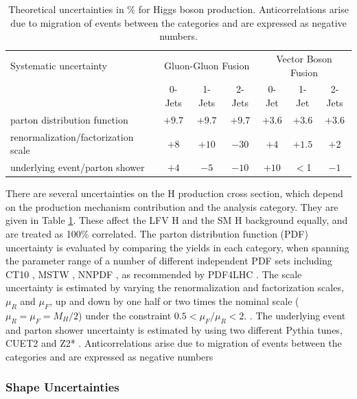 \documentclass[oneside, letterpaper, oldfontcommands]{memoir}
\begin{document}
\begin{table}[hbtp]
 \centering
  \caption{Theoretical uncertainties in \% for Higgs boson production. Anticorrelations arise due to  migration of events between the categories and are expressed as negative numbers. }
  \label{tab:theory_systematics}
  \begin{tabular}{lccc|ccc} \hline
Systematic uncertainty                  &  \multicolumn{3}{c|}{Gluon-Gluon Fusion} &  \multicolumn{3}{c}{Vector Boson Fusion}  \\ \cline{2-7}
                                &    0-Jets  & 1-Jets  & 2-Jets   & 0-Jet & 1-Jet  & 2-Jets  \\ \hline
parton distribution function         &    $+9.7$  &  $+9.7$ &   $+9.7$ & $+3.6$  &   $+3.6$  &  $+3.6$  \\
renormalization/factorization scale           &    $+8$    &  $+10$   &  $-30$   & $+4$     &   $+1.5$  & $+2$   \\
underlying event/parton shower  &   $+4$     & $-5$   &  $-10$   & $+10$    &   $<$1    & $-1$   \\ \hline
  \end{tabular}

\end{table}


\qquad There are several uncertainties on the H production cross section, which depend on the production mechanism contribution and the analysis category. They are given in Table \ref{tab:theory_systematics}. These affect the LFV H and the SM H background equally, and are treated as 100\% correlated. The parton distribution function (PDF) uncertainty is evaluated by comparing the yields in each category, when spanning the parameter range of a number of different independent PDF sets including CT10 \cite{Nadolsky:2008zw}, MSTW \cite{Martin:2009iq}, NNPDF \cite{Ball:2010de}, as recommended by PDF4LHC \cite{Alekhin:2011sk}. The scale uncertainty is estimated by varying the renormalization and factorization scales, $\mu_{R}$ and $\mu_{F}$, up and down by one half or two times the nominal scale ($\mu_{R} = \mu_{F} = M_{H}/2$) under the constraint $0.5 < \mu_{F}/\mu_{R} < 2$. \cite{Dittmaier:2011ti}. The underlying event and parton shower uncertainty is estimated by using two different {\sc Pythia} tunes, CUET2\cite{Khachatryan:2015pea} and Z2* \cite{Field:2012jv}. Anticorrelations arise due to migration of events between the categories and are expressed as negative numbers
 
\subsubsection{Shape Uncertainties}
\end{document}
